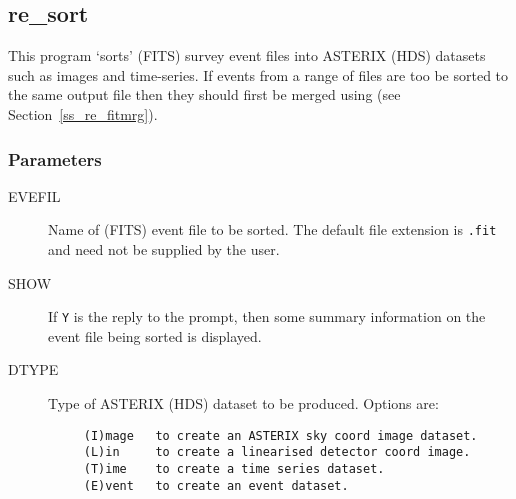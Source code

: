 \subsection{\label{ss_re_sort}re\_sort}

This program `sorts' (FITS) survey event files into ASTERIX (HDS)
datasets such as images and time-series.  If events from a range of
files are too be sorted to the same output file then they should first
be merged using  (see
Section~\ref{ss_re_fitmrg}).

\subsubsection{Parameters}

\begin{description}
\item[EVEFIL   ]
Name of (FITS) event file to be sorted.  The default file extension is
{\tt .fit} and need not be supplied by the user.
\item[SHOW   ]
If {\tt Y} is the reply to the prompt, then some summary information on the
event file being sorted is displayed.
\item[DTYPE   ]
 Type of ASTERIX (HDS) dataset to be produced.  Options are:

\begin{verbatim}
     (I)mage   to create an ASTERIX sky coord image dataset.
     (L)in     to create a linearised detector coord image.
     (T)ime    to create a time series dataset.
     (E)vent   to create an event dataset.
\end{verbatim}


\end{description}
